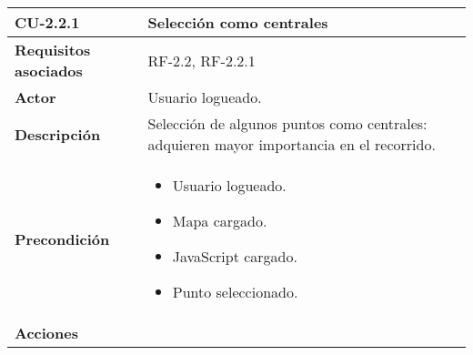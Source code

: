 \begin{longtable}[H]{@{}l|l@{}}
	\toprule
	\begin{minipage}[b]{0.23\columnwidth}\raggedright\strut
		\textbf{CU-2.2.1}\strut
	\end{minipage} & \begin{minipage}[b]{0.71\columnwidth}\raggedright\strut
		\textbf{Selección como centrales}\strut
	\end{minipage}\tabularnewline
	\toprule
	\endhead
	\begin{minipage}[t]{0.23\columnwidth}\raggedright\strut
		\textbf{Requisitos asociados}\strut
	\end{minipage} & \begin{minipage}[t]{0.71\columnwidth}\raggedright\strut
		RF-2.2, RF-2.2.1\strut
	\end{minipage}\tabularnewline
	\midrule
	\begin{minipage}[t]{0.23\columnwidth}\raggedright\strut
		\textbf{Actor}\strut
	\end{minipage} & \begin{minipage}[t]{0.71\columnwidth}\raggedright\strut
		Usuario logueado.\strut
	\end{minipage}\tabularnewline
	\midrule
	\begin{minipage}[t]{0.23\columnwidth}\raggedright\strut
		\textbf{Descripción}\strut
	\end{minipage} & \begin{minipage}[t]{0.71\columnwidth}\raggedright\strut
		Selección de algunos puntos como centrales: adquieren mayor importancia en el recorrido.\strut
	\end{minipage}\tabularnewline
	\midrule
	\begin{minipage}[t]{0.23\columnwidth}\raggedright\strut
		\textbf{Precondición}\strut
	\end{minipage} & \begin{minipage}[t]{0.71\columnwidth}\raggedright\strut
		\begin{itemize}
			\item Usuario logueado.
			\item Mapa cargado.
			\item JavaScript cargado.
			\item Punto seleccionado.
		\end{itemize}
	\end{minipage}\tabularnewline
	\midrule
	\begin{minipage}[t]{0.23\columnwidth}\raggedright\strut
		\textbf{Acciones}\strut

\end{minipage}
\end{longtable}
